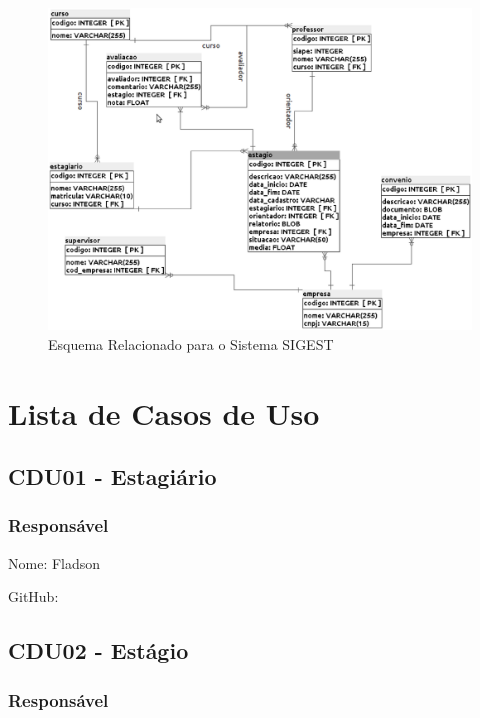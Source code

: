 \documentclass[12pt,a4paper]{report}
\begin{document}
\begin{figure}[!htb]
        \centering
        \includegraphics[scale=0.4]{esquema_sigest.eps}
        \caption{Esquema Relacionado para o Sistema SIGEST}
        \label{esquema_sigest}
\end{figure}


\chapter{Lista de Casos de Uso}

\section{CDU01 - Estagiário}

\subsection{Responsável}

Nome: Fladson

GitHub:



\section{CDU02 - Estágio}

\subsection{Responsável}
\end{document}
